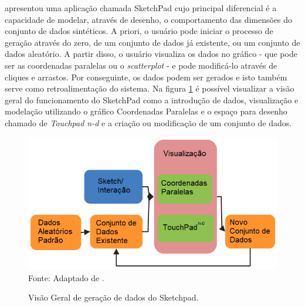 \documentclass[
	12pt,				%
	openright,			%
	oneside,			%
	a4paper,			%
	english,			%
	brazil				%
	]{abntex2}
\begin{document}
		\cite{wang2013sketchpadn} apresentou uma aplicação chamada SketchPad cujo principal diferencial é a capacidade de modelar, através de desenho, o comportamento das dimensões do conjunto de dados sintéticos. A priori, o usuário pode iniciar o processo de geração através do zero, de um conjunto de dados já existente, ou um conjunto de dados aleatório. A partir disso, o usuário visualiza os dados no gráfico - que pode ser as coordenadas paralelas ou o \emph{scatterplot} - e pode modificá-lo através de cliques e arrastos. Por conseguinte, os dados podem ser gerados e isto também serve como retroalimentação do sistema. Na figura \ref{fig:sketchpad} é possível visualizar a visão geral do funcionamento do SketchPad como a introdução de dados, visualização e modelação utilizando o gráfico Coordenadas Paralelas e o espaço para desenho chamado de \emph{Touchpad n-d} e a criação ou modificação de um conjunto de dados.
		\begin{figure}[h!]
			\centering
			\caption{Visão Geral de geração de dados do Sketchpad.}
			\includegraphics[width=\linewidth]{./figures/TrabalhosRelacionados/Wang11.png}
			\label{fig:sketchpad}
			\footnotesize Fonte: Adaptado de \cite{wang2013sketchpadn}.
		\end{figure}
\end{document}
